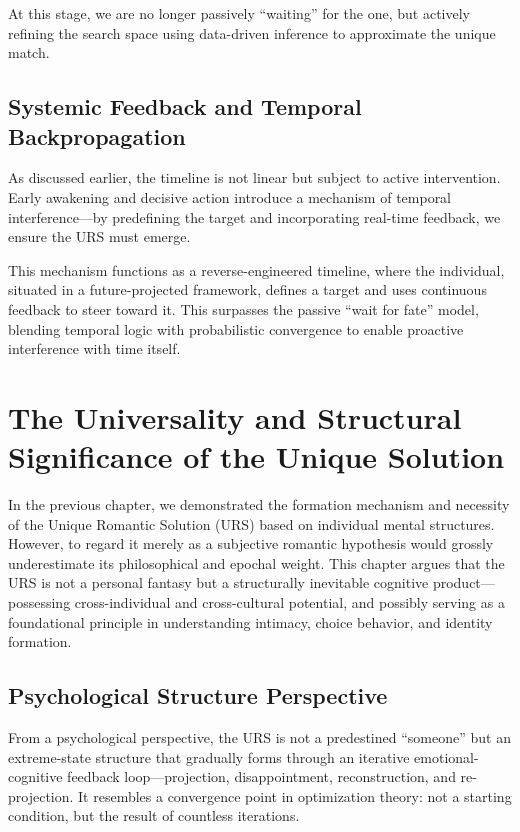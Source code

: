 \documentclass[12pt]{article}
\begin{document}
At this stage, we are no longer passively ``waiting'' for the one, but actively refining the search space using data-driven inference to approximate the unique match.

\subsection{Systemic Feedback and Temporal Backpropagation}

As discussed earlier, the timeline is not linear but subject to active intervention. Early awakening and decisive action introduce a mechanism of temporal interference—by predefining the target and incorporating real-time feedback, we ensure the URS must emerge.

This mechanism functions as a reverse-engineered timeline, where the individual, situated in a future-projected framework, defines a target and uses continuous feedback to steer toward it. This surpasses the passive ``wait for fate'' model, blending temporal logic with probabilistic convergence to enable proactive interference with time itself.
\section{The Universality and Structural Significance of the Unique Solution}

In the previous chapter, we demonstrated the formation mechanism and necessity of the Unique Romantic Solution (URS) based on individual mental structures. However, to regard it merely as a subjective romantic hypothesis would grossly underestimate its philosophical and epochal weight. This chapter argues that the URS is not a personal fantasy but a structurally inevitable cognitive product—possessing cross-individual and cross-cultural potential, and possibly serving as a foundational principle in understanding intimacy, choice behavior, and identity formation.

\subsection{Psychological Structure Perspective}

From a psychological perspective, the URS is not a predestined ``someone'' but an extreme-state structure that gradually forms through an iterative emotional-cognitive feedback loop—projection, disappointment, reconstruction, and re-projection. It resembles a convergence point in optimization theory: not a starting condition, but the result of countless iterations.
\end{document}
